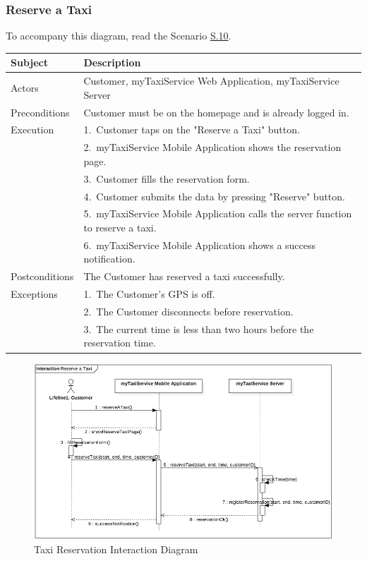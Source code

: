 \subsubsection{Reserve a Taxi}
			To accompany this diagram, read the Scenario \hyperref[sec:TaxiReservationScenario]{S.10}.

				\begin{table}[htpb]
					\centering
					\label{tab:TaxiReservationTable}
					\begin{tabularx}{\textwidth}{lp{9cm}}
						\hline
						\hline
							\textbf{Subject}
						& 
							\textbf{Description}\\
						\hline
							Actors	       &  Customer, myTaxiService Web Application, myTaxiService Server\\
						\hline
							Preconditions  &  Customer must be on the homepage and is already logged in.\\
						\hline
							Execution      &  1.~Customer taps on the "Reserve a Taxi" button.\\
										   &  2.~myTaxiService Mobile Application shows the reservation page.\\
										   &  3.~Customer fills the reservation form.\\
										   &  4.~Customer submits the data by pressing "Reserve" button.\\
										   &  5.~myTaxiService Mobile Application calls the server function to reserve a taxi.\\
										   &  6.~myTaxiService Mobile Application shows a success notification.\\
						\hline
							Postconditions &  The Customer has reserved a taxi successfully.\\
						\hline
							Exceptions     &  1.~The Customer's GPS is off.\\
							               &  2.~The Customer disconnects before reservation.\\
							               &  3.~The current time is less than two hours before the reservation time.\\
									
						\hline
						\hline
					\end{tabularx}
				\end{table}
				
				\begin{figure}[H]
					\centering
					\includegraphics[width=\textwidth, scale=0.5]{IMG/InteractionDiagrams/TaxiReservation.png}
					\caption{Taxi Reservation Interaction Diagram}\label{sec:FigureTaxiReservation}
				\end{figure}